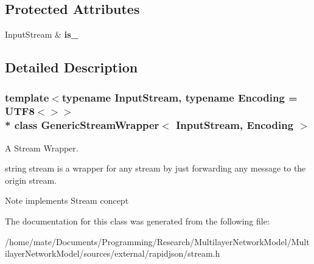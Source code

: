 \subsection*{Protected Attributes}
\begin{DoxyCompactItemize}
\item 
Input\+Stream \& {\bfseries is\+\_\+}\hypertarget{classGenericStreamWrapper_a2b44ae2c9460c2e18aca6ba25c537cc5}{}\label{classGenericStreamWrapper_a2b44ae2c9460c2e18aca6ba25c537cc5}

\end{DoxyCompactItemize}


\subsection{Detailed Description}
\subsubsection*{template$<$typename Input\+Stream, typename Encoding = U\+T\+F8$<$$>$$>$\\*
class Generic\+Stream\+Wrapper$<$ Input\+Stream, Encoding $>$}

A Stream Wrapper. 

string stream is a wrapper for any stream by just forwarding any  message to the origin stream. \begin{DoxyNote}{Note}
implements Stream concept 
\end{DoxyNote}


The documentation for this class was generated from the following file\+:\begin{DoxyCompactItemize}
\item 
/home/mate/\+Documents/\+Programming/\+Research/\+Multilayer\+Network\+Model/\+Multilayer\+Network\+Model/sources/external/rapidjson/stream.\+h\end{DoxyCompactItemize}
